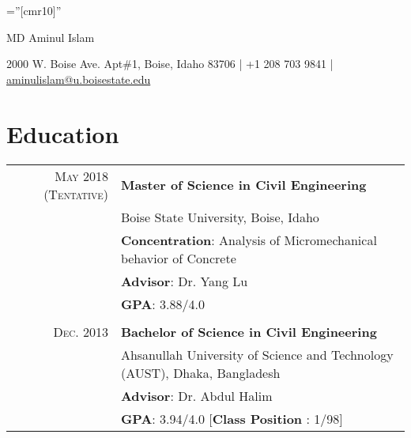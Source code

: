 \documentclass[a4paper,10pt]{article}
\begin{document}

\pagestyle{empty} %

\font\fb=''[cmr10]'' %

\begin{center}
		{\Huge MD Aminul Islam}
\end{center}


\begin{center}
    2000 W. Boise Ave. Apt\#1, Boise, Idaho 83706 | +1 208 703 9841 | \href{mailto:aminulislam@u.boisestate.edu}{aminulislam@u.boisestate.edu}
\end{center}


\section{Education}
\begin{tabular}{rl}	
 
 \textsc{May 2018 (Tentative)} & \textbf{Master of Science in Civil Engineering}\\ 
 &Boise State University, Boise, Idaho\\
& \textbf{Concentration}: Analysis of Micromechanical behavior of Concrete\\
& \textbf{Advisor}: Dr. Yang Lu\\
&\textbf{GPA}: 3.88/4.0\\
&\\
\textsc{Dec.} 2013& \textbf{Bachelor of Science in Civil Engineering} \\
 &Ahsanullah University of Science and Technology (AUST), Dhaka, Bangladesh\\
&  \textbf{Advisor}: Dr. Abdul Halim\\
&\textbf{GPA}: 3.94/4.0 [\textbf{Class Position} : 1/98]
\end{tabular}
\end{document}
